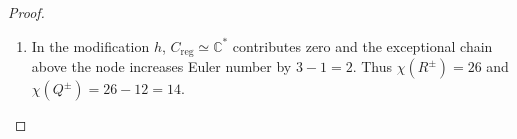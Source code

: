 \begin{proof}
\begin{enumerate}[label=\arabic*.,leftmargin=*]
\item In the modification $h$,
$C_{\mathrm{reg}}\simeq\mathbb C^*$ contributes zero and
the exceptional chain above the node increases Euler number
by $3-1=2$. Thus $\chi(R^\pm)=26$ and
$\chi(Q^\pm)=26-12=14$.
\end{enumerate}
\end{proof}
